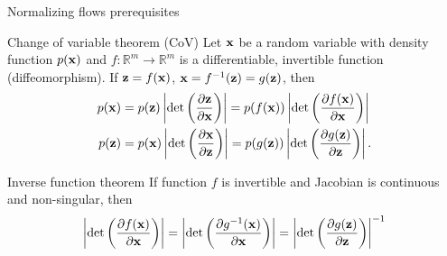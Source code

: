 \begin{frame}{Normalizing flows prerequisites}
	\begin{block}{Change of variable theorem (CoV)}
		Let $\mathbf{x}$ be a random variable with density function $p(\mathbf{x})$ and $f: \mathbb{R}^m \rightarrow \mathbb{R}^m$ is a differentiable, invertible function (diffeomorphism). If $\mathbf{z} = f(\mathbf{x})$, $\mathbf{x} = f^{-1}(\mathbf{z}) = g(\mathbf{z})$, then
		\begin{align*}
			p(\mathbf{x}) &= p(\mathbf{z}) \left|\det \left(  \frac{\partial \mathbf{z}}{\partial \mathbf{x}} \right) \right| = p(f(\mathbf{x})) \left|\det \left(  \frac{\partial f(\mathbf{x})}{\partial \mathbf{x}} \right) \right| \\
			p(\mathbf{z}) &= p(\mathbf{x}) \left|\det \left(  \frac{\partial \mathbf{x}}{\partial \mathbf{z}} \right) \right| = p(g(\mathbf{z})) \left|\det \left(  \frac{\partial g(\mathbf{z})}{\partial \mathbf{z}} \right) \right|.
		\end{align*}
		\vspace{-0.5cm}
	\end{block}
	\begin{block}{Inverse function theorem}
		If function $f$ is invertible and Jacobian is continuous and non-singular, then
		\[
			\left|\det \left(  \frac{\partial f(\mathbf{x})}{\partial \mathbf{x}} \right)\right| = \left|\det \left(  \frac{\partial g^{-1}(\mathbf{x})}{\partial \mathbf{x}} \right)\right| = \left|\det \left(  \frac{\partial g(\mathbf{z})}{\partial \mathbf{z}} \right)\right|^{-1}
		\]
	\end{block}
\end{frame}
